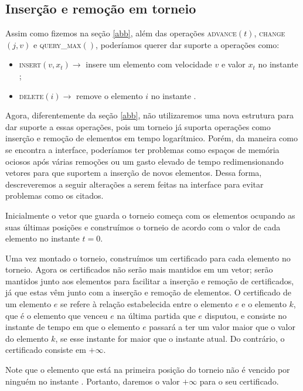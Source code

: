 
\FloatBarrier
\subsection{Inserção e remoção em torneio} \label{trni:secao}

Assim como fizemos na seção \ref{abb}, além das operações
\textsc{advance}$(t)$, \textsc{change}$(j, v)$ e
\textsc{query\_max}$()$, poderíamos querer dar suporte a operações
como:

\begin{itemize}
    \item \textsc{insert}$(v, x_t)\rightarrow$ insere um elemento
    com velocidade $v$ e valor $x_t$ no instante \now;
    \item \textsc{delete}$(i) \rightarrow$ remove o elemento $i$ no
    instante \now.
\end{itemize}
Agora, diferentemente da seção \ref{abb}, não utilizaremos uma nova
estrutura para dar suporte a essas operações, pois um torneio já
suporta operações como inserção e remoção de elementos em tempo
logarítmico. Porém, da maneira como se encontra a interface,
poderíamos ter problemas como espaços de memória ociosos após várias
remoções ou um gasto elevado de tempo redimensionando vetores para
que suportem a inserção de novos elementos. Dessa forma,
descreveremos a seguir alterações a serem feitas na interface para
evitar problemas como os citados.

Inicialmente o vetor que guarda o torneio começa com os elementos
ocupando as suas últimas posições e construímos o torneio de acordo
com o valor de cada elemento no instante $t = 0$.

Uma vez montado o torneio, construímos um certificado para cada
elemento no torneio. Agora os certificados não serão mais mantidos
em um vetor; serão mantidos junto aos elementos para facilitar a
inserção e remoção de certificados, já que estas vêm junto com a
inserção e remoção de elementos. O certificado de um elemento $e$ se
refere à relação estabelecida entre o elemento $e$ e o elemento $k$,
que é o elemento que venceu $e$ na última partida que $e$ disputou,
e consiste no instante de tempo em que o elemento $e$ passará a ter
um valor maior que o valor do elemento $k$, se esse instante for
maior que o instante atual. Do contrário, o certificado consiste em
$+\infty$.

Note que o elemento que está na primeira posição do torneio não é
vencido por ninguém no instante \now. Portanto, daremos o valor
$+\infty$ para o seu certificado.


